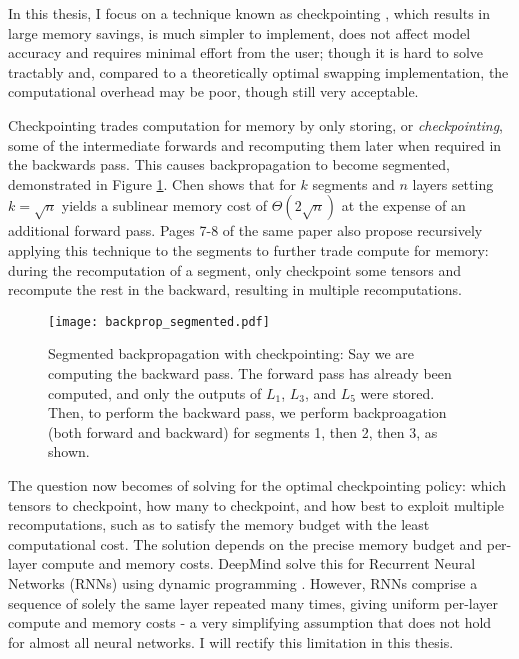 In this thesis, I focus on a technique known as checkpointing \cite{Dauvergne2006, Siskind2018, Chen2016, Gruslys2016, Wang2018}, which results in large memory savings, is much simpler to implement, does not affect model accuracy and requires minimal effort from the user; though it is hard to solve tractably and, compared to a theoretically optimal swapping implementation, the computational overhead may be poor, though still very acceptable.

Checkpointing trades computation for memory by only storing, or \textit{checkpointing}, some of the intermediate forwards and recomputing them later when required in the backwards pass. This causes backpropagation to become segmented, demonstrated in Figure \ref{fig:1-backprop-segmented}. Chen \cite{Chen2016} shows that for \(k\) segments and \(n\) layers setting \(k = \sqrt{n}\) yields a sublinear memory cost of \(\Theta (2\sqrt{n})\) at the expense of an additional forward pass. Pages 7-8 of the same paper also propose recursively applying this technique to the segments to further trade compute for memory: during the recomputation of a segment, only checkpoint some tensors and recompute the rest in the backward, resulting in multiple recomputations.

\begin{figure}[t]
    \centering
    \texttt{[image: backprop\_segmented.pdf]}
    \caption{Segmented backpropagation with checkpointing: Say we are computing the backward pass. The forward pass has already been computed, and only the outputs of \(L_1\), \(L_3\), and \(L_5\) were stored. Then, to perform the backward pass, we perform backproagation (both forward and backward) for segments 1, then 2, then 3, as shown.}
    \label{fig:1-backprop-segmented}
\end{figure}

The question now becomes of solving for the optimal checkpointing policy: which tensors to checkpoint, how many to checkpoint, and how best to exploit multiple recomputations, such as to satisfy the memory budget with the least computational cost. The solution depends on the precise memory budget and per-layer compute and memory costs. DeepMind solve this for Recurrent Neural Networks (RNNs) using dynamic programming \cite{Gruslys2016}. However, RNNs comprise a sequence of solely the same layer repeated many times, giving uniform per-layer compute and memory costs - a very simplifying assumption that does not hold for almost all neural networks. I will rectify this limitation in this thesis.

